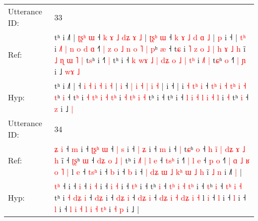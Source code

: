 \documentclass[10pt]{article}
\DeclareRobustCommand{\hl}[1]{{\textcolor{red}{#1}}}
\begin{document}
\begin{longtable}{ll}
 \\
\midrule
Utterance ID: & 33 \\
Ref: & tʰ i ˩˥ |\hl{ }\hl{ʈ}\hl{ʂ}\hl{ʰ}\hl{ }\hl{ɯ} ˧ \hl{k} \hl{ɤ} \hl{˩} \hl{d}\hl{ʑ} \hl{ɤ} \hl{˩} |\hl{ }\hl{ʈ}\hl{ʂ}\hl{ʰ} \hl{ɯ} ˧ \hl{k} \hl{ɤ} \hl{˩} \hl{d} \hl{ɑ} \hl{˩} |\hl{ }\hl{p} i ˧ |\hl{ }\hl{t}\hl{ʰ} i\hl{ }\hl{˩}\hl{˥}\hl{ }\hl{|} \hl{n} \hl{o}\hl{ }\hl{d} \hl{ɑ} ˧\hl{˥} \hl{|}\hl{ }\hl{z} \hl{o} \hl{˩} \hl{n}\hl{ }\hl{o} \hl{˥} \hl{|} \hl{p}ʰ \hl{æ} ˧ t\hl{ɕ} i\hl{ }\hl{˥}\hl{ }\hl{z} \hl{o} \hl{˩}\hl{ }\hl{|} \hl{h} \hl{ɤ} \hl{˩}\hl{ }\hl{h} i\hl{̃} \hl{˩} \hl{ɳ}\hl{ }\hl{ɯ} \hl{˥} \hl{|} t\hl{s}ʰ i ˧\hl{˥}\hl{ }\hl{|} tʰ i ˧\hl{ }\hl{k}\hl{ }\hl{w}\hl{ɤ} \hl{˩} \hl{|} \hl{d}\hl{ʑ} \hl{o} \hl{˩} \hl{|} \hl{t}\hl{ʰ} i\hl{ }\hl{˩}\hl{˥} \hl{|} t\hl{ɕ}ʰ \hl{o} ˧\hl{˥}\hl{ }\hl{|} \hl{ɲ} i ˩\hl{ }\hl{w}\hl{ɤ} \hl{˩}
 \\
Hyp: & tʰ i ˩˥ |\hl{}\hl{}\hl{}\hl{}\hl{}\hl{} ˧ \hl{i} \hl{˧} \hl{i} \hl{}\hl{˧} \hl{i} \hl{˧} |\hl{}\hl{}\hl{}\hl{} \hl{i} ˧ \hl{|} \hl{i} \hl{˧} \hl{|} \hl{i} \hl{˧} |\hl{}\hl{} i ˧ |\hl{}\hl{}\hl{} i\hl{}\hl{}\hl{}\hl{}\hl{} \hl{˧} \hl{}\hl{t}\hl{ʰ} \hl{i} ˧\hl{} \hl{}\hl{t}\hl{ʰ} \hl{i} \hl{˧} \hl{}\hl{t}\hl{ʰ} \hl{i} \hl{˧} \hl{t}ʰ \hl{i} ˧ t\hl{ʰ} i\hl{}\hl{}\hl{}\hl{} \hl{˧} \hl{}\hl{t}\hl{ʰ} \hl{i} \hl{˧} \hl{}\hl{t}\hl{ʰ} i\hl{} \hl{˧} \hl{}\hl{t}\hl{ʰ} \hl{i} \hl{˧} t\hl{}ʰ i ˧\hl{}\hl{}\hl{} tʰ i ˧\hl{}\hl{}\hl{}\hl{}\hl{} \hl{l} \hl{i} \hl{}\hl{˧} \hl{l} \hl{i} \hl{˧} \hl{}\hl{l} i\hl{}\hl{}\hl{} \hl{˧} t\hl{}ʰ \hl{i} ˧\hl{}\hl{}\hl{} \hl{z} i ˩\hl{}\hl{}\hl{} \hl{|}
 \\
\midrule
Utterance ID: & 34 \\
Ref: & \hl{ʑ}\hl{ }\hl{i} ˧\hl{ }\hl{m} i ˧\hl{ }\hl{ʈ}\hl{ʂ}\hl{ʰ} \hl{ɯ} ˧ \hl{|} \hl{s} i ˧ \hl{|} \hl{ʑ} i ˧ \hl{}\hl{m} i ˧\hl{ }\hl{|} t\hl{ɕ}ʰ \hl{o} ˧\hl{ }\hl{h} \hl{i}\hl{̃}\hl{ }\hl{|} \hl{d}\hl{ʑ} \hl{ɤ} \hl{˩}\hl{ }\hl{h} i\hl{̃} ˧ \hl{ʈ}\hl{ʂ}ʰ \hl{ɯ} ˧ \hl{d}\hl{ʑ}\hl{ }\hl{o} \hl{˩} \hl{|} tʰ i \hl{˩}\hl{˥} \hl{|}\hl{ }\hl{l} \hl{e} ˧ \hl{t}\hl{s}\hl{ʰ} i ˧\hl{˥} \hl{|}\hl{ }\hl{l} \hl{e} ˧ \hl{}\hl{p} \hl{o} ˧\hl{˥}\hl{ }\hl{|} \hl{ɑ} \hl{˩} \hl{ʁ}\hl{ }\hl{o} \hl{˥} \hl{|} l \hl{e} ˧ \hl{t}\hl{s}\hl{ʰ} i ˧ \hl{b} i ˧ \hl{b} i ˧ \hl{|} \hl{d}\hl{ʑ} \hl{ɯ} \hl{˩} \hl{k}\hl{ʰ} \hl{ɯ} \hl{˩}\hl{ }\hl{h} i\hl{̃} \hl{˩} \hl{n} i ˩\hl{˥}\hl{ }\hl{|} |
 \\
Hyp: & \hl{}\hl{t}\hl{ʰ} ˧\hl{}\hl{} i ˧\hl{}\hl{}\hl{}\hl{} \hl{i} ˧ \hl{i} \hl{˧} i ˧ \hl{i} \hl{˧} i ˧ \hl{t}\hl{ʰ} i ˧\hl{}\hl{} t\hl{}ʰ \hl{i} ˧\hl{}\hl{} \hl{}\hl{}\hl{t}\hl{ʰ} \hl{}\hl{i} \hl{˧} \hl{}\hl{t}\hl{ʰ} i\hl{} ˧ \hl{}\hl{t}ʰ \hl{i} ˧ \hl{}\hl{}\hl{t}\hl{ʰ} \hl{i} \hl{˧} tʰ i \hl{}\hl{˧} \hl{}\hl{d}\hl{ʑ} \hl{i} ˧ \hl{}\hl{d}\hl{ʑ} i ˧\hl{} \hl{}\hl{d}\hl{ʑ} \hl{i} ˧ \hl{d}\hl{ʑ} \hl{i} ˧\hl{ }\hl{d}\hl{ʑ} \hl{i} \hl{˧} \hl{}\hl{d}\hl{ʑ} \hl{i} \hl{˧} l \hl{i} ˧ \hl{}\hl{}\hl{l} i ˧ \hl{l} i ˧ \hl{l} i ˧ \hl{l} \hl{}\hl{i} \hl{˧} \hl{l} \hl{}\hl{i} \hl{˧} \hl{}\hl{t}\hl{ʰ} i\hl{} \hl{˧} \hl{p} i ˩\hl{}\hl{}\hl{} |

\end{longtable}
\end{document}
